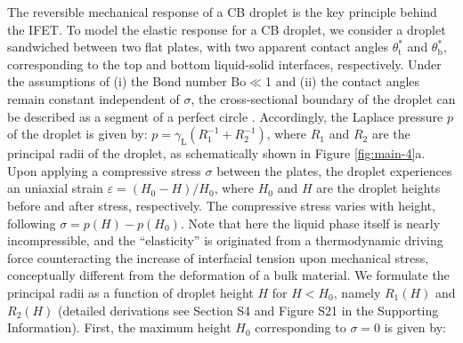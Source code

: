 The reversible mechanical response of a CB droplet is the key
principle behind the IFET. To model the elastic response for a CB
droplet, we consider a droplet sandwiched between two flat plates,
with two apparent contact angles \(\theta_{\mathrm{t}}^{*}\) and
\(\theta_{\mathrm{b}}^{*}\), corresponding to the top and bottom
liquid-solid interfaces, respectively. Under the assumptions of (i)
the Bond number Bo\(\ll\)1 and (ii) the contact angles remain
constant independent of \(\sigma\), the cross-sectional boundary of the
droplet can be described as a segment of a perfect circle
\cite{berthier_2012_microdroplet}. Accordingly, the Laplace pressure
\(p\) of the droplet is given by: \(p = \gamma_{\mathrm{L}}
 (R_{1}^{-1} + R_{2}^{-1})\), where \(R_{1}\) and \(R_{2}\) are the
principal radii of the droplet, as schematically shown in Figure
\ref{fig:main-4}a. Upon applying a compressive stress \(\sigma\) between
the plates, the droplet experiences an uniaxial strain \(\varepsilon =
 (H_{0} - H) / H_{0}\), where \(H_{0}\) and \(H\) are the droplet heights
before and after stress, respectively. The compressive stress varies
with height, following \(\sigma = p(H) - p(H_{0})\). Note that here the
liquid phase itself is nearly incompressible, and the ``elasticity'' is
originated from a thermodynamic driving force counteracting the
increase of interfacial tension upon mechanical stress, conceptually
different from the deformation of a bulk material. We formulate the
principal radii as a function of droplet height \(H\) for \(H < H_{0}\),
namely \(R_{1}(H)\) and \(R_{2}(H)\) (detailed derivations see Section S4
and Figure S21 in the Supporting Information). First, the maximum
height \(H_{0}\) corresponding to \(\sigma=0\) is given by:

